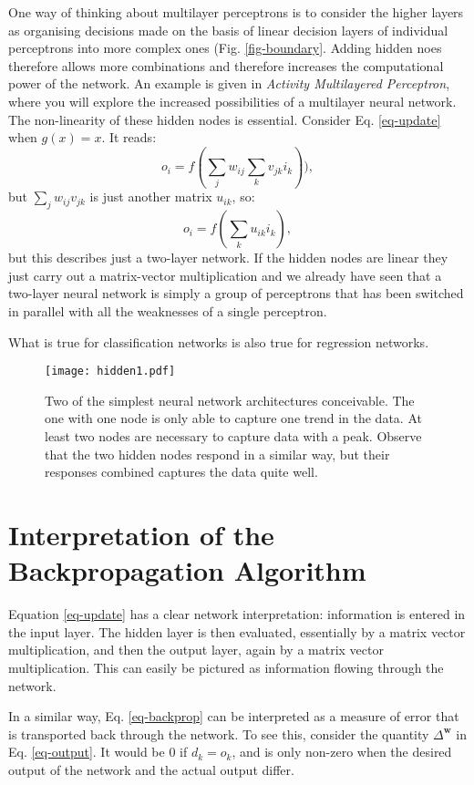     One way of thinking about multilayer perceptrons is to consider the higher layers as organising decisions made on the basis of linear decision layers of individual
    perceptrons into more complex ones (Fig. \ref{fig-boundary}.
    Adding hidden noes therefore allows more combinations and therefore increases the computational power of the network. An example is given in \emph{Activity Multilayered Perceptron},
    where you will explore the increased possibilities of a multilayer neural network. The non-linearity of these hidden nodes is essential. Consider
    Eq. \ref{eq-update} when $g(x) = x$. It reads:
    $$
    o_i = f( \sum_{j} w_{ij}\sum_k v_{jk} i_k)),
    $$
    but $\sum_j w_{ij} v_{jk}$ is just another matrix $u_{ik}$, so:
    $$
    o_i = f(\sum_k u_{ik} i_k),
    $$
    but this describes just a two-layer network. If the hidden nodes are linear they just carry out a matrix-vector multiplication and we already have seen that a two-layer
    neural network is simply a group of perceptrons that has been switched in parallel with all the weaknesses of a single perceptron.

    What is true for classification networks is also true for regression networks.
    \begin{figure}[!ht]
      \begin{center}
        \texttt{[image: hidden1.pdf]}
      \end{center}
      \caption{Two of the simplest neural network architectures conceivable. The one with one node is only able to capture one trend in the data. At least two nodes
        are necessary to capture data with a peak. Observe that the two hidden nodes respond in a similar way, but their responses combined captures the data quite well.}
      \label{eq-arch}
    \end{figure}

    
    \section{Interpretation of the Backpropagation Algorithm}
    \label{sec-interpretation}
    Equation \ref{eq-update} has a clear network interpretation: information is entered in the input layer. The hidden layer is then evaluated, essentially
    by a matrix vector multiplication, and then the output layer, again by a matrix vector multiplication. This can easily be pictured as information
    flowing through the network.

    In a similar way, Eq. \ref{eq-backprop} can be interpreted as a measure of error that is transported back through the network. To see this, consider
    the quantity $\Delta^{\boldsymbol{w}}$ in Eq. \ref{eq-output}. It would be 0 if $d_k = o_k$, and is only non-zero when the desired output of the network and the actual
    output differ.

